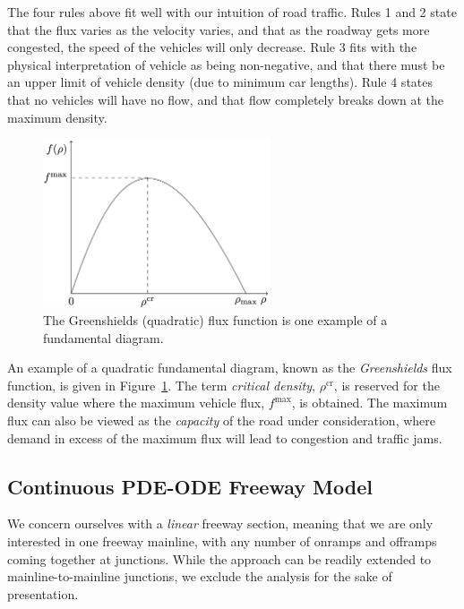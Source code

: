 The four rules above fit well with our intuition of road traffic. Rules 1 and 2 state that the flux varies as the velocity varies, and that as the roadway gets more congested, the speed of the vehicles will only decrease. Rule 3 fits with the physical interpretation of vehicle as being non-negative, and that there must be an upper limit of vehicle density (due to minimum car lengths). Rule 4 states that no vehicles will have no flow, and that flow completely breaks down at the maximum density.

\begin{figure}[htbp]
	\centering
	\includegraphics[width=0.6\textwidth]{diagrams/fd}
	\caption{The Greenshields (quadratic) flux function is one example of a fundamental diagram.}
	\label{fig:greenshields-fd}
\end{figure}

An example of a quadratic fundamental diagram, known as the \emph{Greenshields} flux function, is given in Figure~\ref{fig:greenshields-fd}. The term \emph{critical density}, $\rho^{\text{cr}}$, is reserved for the density value where the maximum vehicle flux, $f^{\max}$, is obtained. The maximum flux can also be viewed as the \emph{capacity} of the road under consideration, where demand in excess of the maximum flux will lead to congestion and traffic jams.

\subsection{Continuous PDE-ODE Freeway Model}
\label{sec:continuous-pde-ode-freeway-model}

We concern ourselves with a \emph{linear} freeway section, meaning that we are only interested in one freeway mainline, with any number of onramps and offramps coming together at junctions. While the approach can be readily extended to mainline-to-mainline junctions, we exclude the analysis for the sake of presentation.

